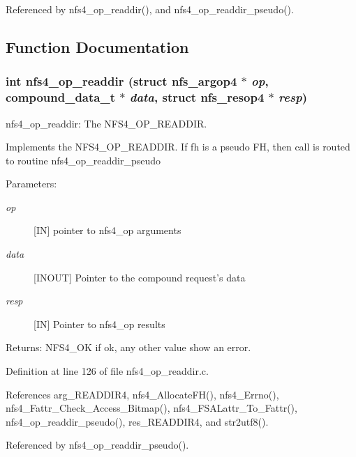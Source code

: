 Referenced by nfs4\_\-op\_\-readdir(), and nfs4\_\-op\_\-readdir\_\-pseudo().

\subsection{Function Documentation}
\subsubsection{\setlength{\rightskip}{0pt plus 5cm}int nfs4\_\-op\_\-readdir (struct nfs\_\-argop4 $\ast$ {\em op}, compound\_\-data\_\-t $\ast$ {\em data}, struct nfs\_\-resop4 $\ast$ {\em resp})}\label{nfs4__op__readdir_8c_a3}


nfs4\_\-op\_\-readdir: The NFS4\_\-OP\_\-READDIR.

Implements the NFS4\_\-OP\_\-READDIR. If fh is a pseudo FH, then call is routed to routine nfs4\_\-op\_\-readdir\_\-pseudo

\begin{Desc}
\item[Parameters:]
\begin{description}
\item[{\em op}][IN] pointer to nfs4\_\-op arguments \item[{\em data}][INOUT] Pointer to the compound request's data \item[{\em resp}][IN] Pointer to nfs4\_\-op results\end{description}
\end{Desc}
\begin{Desc}
\item[Returns:]NFS4\_\-OK if ok, any other value show an error. \end{Desc}


Definition at line 126 of file nfs4\_\-op\_\-readdir.c.

References arg\_\-READDIR4, nfs4\_\-Allocate\-FH(), nfs4\_\-Errno(), nfs4\_\-Fattr\_\-Check\_\-Access\_\-Bitmap(), nfs4\_\-FSALattr\_\-To\_\-Fattr(), nfs4\_\-op\_\-readdir\_\-pseudo(), res\_\-READDIR4, and str2utf8().

Referenced by nfs4\_\-op\_\-readdir\_\-pseudo().
